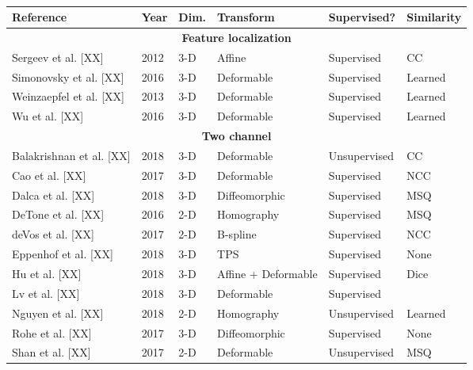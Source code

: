 

\begin{table}[!htb]
\centering
\caption{}
\label{table:methods}
\begin{tabular*}{\textwidth}{l@{\extracolsep{\fill}}l@{\extracolsep{\fill}}l@{\extracolsep{\fill}}l@{\extracolsep{\fill}}l@{\extracolsep{\fill}}l}
\toprule
\textbf{Reference} & \textbf{Year} & \textbf{Dim.} & \textbf{Transform} & \textbf{Supervised?} & \textbf{Similarity} \\
\midrule
\midrule
\multicolumn{6}{c}{\textbf{Feature localization}}
  \vspace{0.25cm} \\
  Sergeev et al. [XX] & 2012 & 3-D & Affine & Supervised & CC \\
  Simonovsky et al. [XX] & 2016 & 3-D & Deformable & Supervised & Learned \\
  Weinzaepfel et al. [XX] & 2013 & 3-D & Deformable & Supervised & Learned \\
  Wu et al. [XX] & 2016 & 3-D & Deformable & Supervised & Learned \\
\midrule
\multicolumn{6}{c}{\textbf{Two channel}}
  \vspace{0.25cm} \\
  Balakrishnan et al. [XX] & 2018 & 3-D & Deformable & Unsupervised & CC \\
  Cao et al. [XX] & 2017 & 3-D & Deformable & Supervised & NCC \\
  Dalca et al. [XX] & 2018 & 3-D & Diffeomorphic & Supervised & MSQ \\
  DeTone et al. [XX] & 2016 & 2-D & Homography & Supervised & MSQ \\
  deVos et al. [XX] & 2017 & 2-D & B-spline & Supervised & NCC \\
  Eppenhof et al. [XX] & 2018 & 3-D & TPS & Supervised & None \\       %
  Hu et al. [XX] & 2018 & 3-D & Affine + Deformable & Supervised & Dice \\
  Lv et al. [XX] & 2018 & 3-D & Deformable & Supervised & {} \\
  Nguyen et al. [XX] & 2018 & 2-D & Homography & Unsupervised & Learned \\
  Rohe et al. [XX] & 2017 & 3-D & Diffeomorphic & Supervised & None \\  %
  Shan et al. [XX] & 2017 & 2-D & Deformable & Unsupervised & MSQ \\

\end{tabular*}
\end{table}
